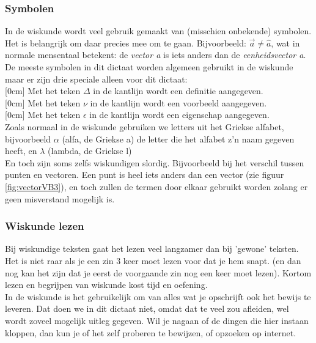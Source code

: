     


\subsubsection{Symbolen}
In de wiskunde wordt veel gebruik gemaakt van (misschien onbekende) symbolen. Het is belangrijk om daar precies mee om te gaan. Bijvoorbeeld: $ \vec{a} \ne \hat{a} $, wat in normale mensentaal betekent: de \textit{vector a} is iets anders dan de \textit{eenheidsvector a}. 
De meeste symbolen in dit dictaat worden algemeen gebruikt in de wiskunde maar er zijn drie speciale alleen voor dit dictaat:\\
[0cm]
Met het teken {\Large $ \Delta $ }in de kantlijn wordt een definitie aangegeven.\\
[0cm]
Met het teken {\LARGE $ \nu $ }  in de kantlijn wordt een voorbeeld aangegeven.\\
[0cm]
Met het teken {\LARGE $ \epsilon $ }  in de kantlijn wordt  een eigenschap aangegeven.\\

Zoals normaal in de wiskunde gebruiken we letters uit het Griekse alfabet, bijvoorbeeld $ \alpha $ (alfa, de Griekse a) de letter die het alfabet z'n naam gegeven heeft, en  $ \lambda $ (lambda, de Griekse l)\\
En toch zijn soms zelfs wiskundigen slordig. Bijvoorbeeld bij het verschil tussen punten en vectoren. Een punt is heel iets anders dan een vector  (zie figuur \ref{fig:vectorVB3}), en toch zullen de termen door elkaar gebruikt worden zolang er geen misverstand mogelijk is.

\subsubsection{Wiskunde lezen}
Bij wiskundige teksten gaat het lezen veel langzamer  dan bij 'gewone' teksten. Het is niet raar als je een zin 3 keer moet lezen voor dat je hem snapt. (en dan nog kan het zijn dat je eerst de voorgaande zin nog een keer moet lezen). Kortom lezen en begrijpen van wiskunde kost tijd en oefening. \\

In de wiskunde is het gebruikelijk om van alles wat je opschrijft ook het bewijs te leveren. Dat doen we in dit dictaat niet, omdat dat te veel zou afleiden, wel wordt zoveel mogelijk uitleg gegeven. Wil je nagaan of de dingen die hier instaan kloppen, dan kun je of het zelf proberen te bewijzen, of opzoeken op internet.

